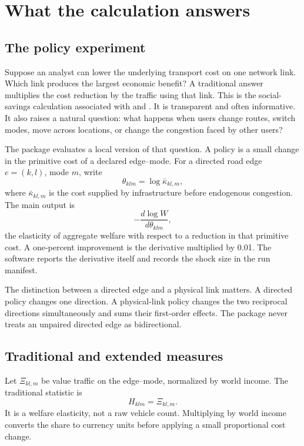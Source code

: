 \chapter{What the calculation answers}
\label{ch:question}

\section{The policy experiment}

Suppose an analyst can lower the underlying transport cost on one network
link. Which link produces the largest economic benefit? A traditional answer
multiplies the cost reduction by the traffic using that link. This is the
social-savings calculation associated with \citet{fogel1962quantitative} and
\citet{Fogel1964Railroads}. It is transparent and often informative. It also
raises a natural question: what happens when users change routes, switch
modes, move across locations, or change the congestion faced by other users?

The package evaluates a local version of that question. A policy is a small
change in the primitive cost of a declared edge--mode. For a directed road
edge \(e=(k,l)\), mode \(m\), write
\[
  \theta_{klm}=\log\bar\kappa_{kl,m},
\]
where \(\bar\kappa_{kl,m}\) is the cost supplied by infrastructure before
endogenous congestion. The main output is
\[
  -\frac{d\log W}{d\theta_{klm}},
\]
the elasticity of aggregate welfare with respect to a reduction in that
primitive cost. A one-percent improvement is the derivative multiplied by
0.01. The software reports the derivative itself and records the shock size in
the run manifest.

The distinction between a directed edge and a physical link matters. A
directed policy changes one direction. A physical-link policy changes the two
reciprocal directions simultaneously and sums their first-order effects. The
package never treats an unpaired directed edge as bidirectional.

\section{Traditional and extended measures}

Let \(\Xi_{kl,m}\) be value traffic on the edge--mode, normalized by world
income. The traditional statistic is
\[
  H_{klm}=\Xi_{kl,m}.
\]
It is a welfare elasticity, not a raw vehicle count. Multiplying by world
income converts the share to currency units before applying a small
proportional cost change.


